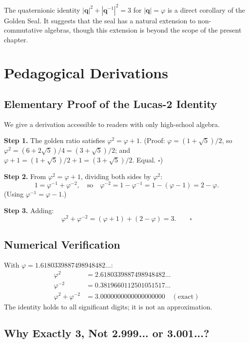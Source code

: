 The quaternionic identity $|\mathbf{q}|^2 + |\mathbf{q}^{-1}|^2
= 3$ for $|\mathbf{q}| = \varphi$ is a direct corollary of
the Golden Seal.  It suggests that the seal has a natural
extension to non-commutative algebras, though this extension
is beyond the scope of the present chapter.

\section{Pedagogical Derivations}
\label{sec:gs-pedagogy}

\subsection{Elementary Proof of the Lucas-2 Identity}

We give a derivation accessible to readers with only
high-school algebra.

\textbf{Step 1.}  The golden ratio satisfies
$\varphi^2 = \varphi + 1$.  (Proof: $\varphi = (1+\sqrt5)/2$,
so $\varphi^2 = (6+2\sqrt5)/4 = (3+\sqrt5)/2$; and
$\varphi + 1 = (1+\sqrt5)/2 + 1 = (3+\sqrt5)/2$. Equal. $\square$)

\textbf{Step 2.}  From $\varphi^2 = \varphi + 1$, dividing
both sides by $\varphi^2$:
\[
  1 = \varphi^{-1} + \varphi^{-2},
  \quad \text{so} \quad
  \varphi^{-2} = 1 - \varphi^{-1} = 1 - (\varphi - 1) = 2 - \varphi.
\]
(Using $\varphi^{-1} = \varphi - 1$.)

\textbf{Step 3.}  Adding:
\[
  \varphi^2 + \varphi^{-2}
  = (\varphi + 1) + (2 - \varphi)
  = 3. \qquad \square
\]

\subsection{Numerical Verification}

With $\varphi = 1.6180339887498948482\ldots$:
\begin{align*}
  \varphi^2 &= 2.6180339887498948482\ldots \\
  \varphi^{-2} &= 0.3819660112501051517\ldots \\
  \varphi^2 + \varphi^{-2} &= 3.0000000000000000000 \quad (\text{exact})
\end{align*}
The identity holds to all significant digits; it is not an
approximation.

\subsection{Why Exactly 3, Not 2.999... or 3.001...?}

